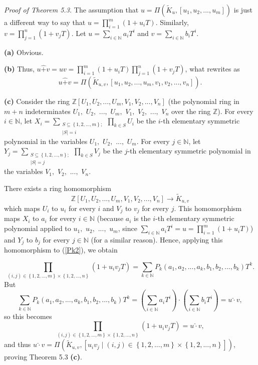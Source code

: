 \documentclass[12pt,final,notitlepage,onecolumn,german]{article}%
\begin{document}
\textit{Proof of Theorem 5.3.} The assumption that $u=\Pi\left(  \widetilde
{K}_{u},\left[  u_{1},u_{2},...,u_{m}\right]  \right)  $ is just a different
way to say that $u=\prod\limits_{i=1}^{m}\left(  1+u_{i}T\right)  $.
Similarly, $v=\prod\limits_{j=1}^{n}\left(  1+v_{j}T\right)  $. Let
$u=\sum\limits_{i\in\mathbb{N}}a_{i}T^{i}$ and $v=\sum\limits_{i\in\mathbb{N}%
}b_{i}T^{i}$.

\textbf{(a)} Obvious.

\textbf{(b)} Thus, $u\widehat{+}v=uv=\prod\limits_{i=1}^{m}\left(
1+u_{i}T\right)  \prod\limits_{j=1}^{n}\left(  1+v_{j}T\right)  $, what
rewrites as%
\[
u\widehat{+}v=\Pi\left(  \widetilde{K}_{u,v},\left[  u_{1},u_{2}%
,...,u_{m},v_{1},v_{2},...,v_{n}\right]  \right)  .
\]


\textbf{(c)} Consider the ring $\mathbb{Z}\left[  U_{1},U_{2},...,U_{m}%
,V_{1},V_{2},...,V_{n}\right]  $ (the polynomial ring in $m+n$ indeterminates
$U_{1},$ $U_{2},$ $...,$ $U_{m},$ $V_{1},$ $V_{2},$ $...,$ $V_{n}$ over the
ring $\mathbb{Z}$). For every $i\in\mathbb{N}$, let $X_{i}=\sum
\limits_{\substack{S\subseteq\left\{  1,2,...,m\right\}  ;\\\left\vert
S\right\vert =i}}\prod\limits_{k\in S}U_{i}$ be the $i$-th elementary
symmetric polynomial in the variables $U_{1},$ $U_{2},$ $...,$ $U_{m}$. For
every $j\in\mathbb{N}$, let $Y_{j}=\sum\limits_{\substack{S\subseteq\left\{
1,2,...,n\right\}  ;\\\left\vert S\right\vert =j}}\prod\limits_{k\in S}V_{j}$
be the $j$-th elementary symmetric polynomial in the variables $V_{1},$
$V_{2},$ $...,$ $V_{n}$.

There exists a ring homomorphism%
\[
\mathbb{Z}\left[  U_{1},U_{2},...,U_{m},V_{1},V_{2},...,V_{n}\right]
\rightarrow\widetilde{K}_{u,v}%
\]
which maps $U_{i}$ to $u_{i}$ for every $i$ and $V_{j}$ to $v_{j}$ for every
$j$. This homomorphism maps $X_{i}$ to $a_{i}$ for every $i\in\mathbb{N}$
(because $a_{i}$ is the $i$-th elementary symmetric polynomial applied to
$u_{1},$ $u_{2},$ $...,$ $u_{m}$, since $\sum\limits_{i\in\mathbb{N}}%
a_{i}T^{i}=u=\prod\limits_{i=1}^{m}\left(  1+u_{i}T\right)  $) and $Y_{j}$ to
$b_{j}$ for every $j\in\mathbb{N}$ (for a similar reason). Hence, applying
this homomorphism to (\ref{Pk2}), we obtain%

\[
\prod_{\left(  i,j\right)  \in\left\{  1,2,...,m\right\}  \times\left\{
1,2,...,n\right\}  }\left(  1+u_{i}v_{j}T\right)  =\sum_{k\in\mathbb{N}}%
P_{k}\left(  a_{1},a_{2},...,a_{k},b_{1},b_{2},...,b_{k}\right)  T^{k}.
\]
But%
\[
\sum_{k\in\mathbb{N}}P_{k}\left(  a_{1},a_{2},...,a_{k},b_{1},b_{2}%
,...,b_{k}\right)  T^{k}=\left(  \sum_{i\in\mathbb{N}}a_{i}T^{i}\right)
\widehat{\cdot}\left(  \sum_{i\in\mathbb{N}}b_{i}T^{i}\right)  =u\widehat
{\cdot}v,
\]
so this becomes%
\[
\prod_{\left(  i,j\right)  \in\left\{  1,2,...,m\right\}  \times\left\{
1,2,...,n\right\}  }\left(  1+u_{i}v_{j}T\right)  =u\widehat{\cdot}v,
\]
and thus $u\widehat{\cdot}v=\Pi\left(  \widetilde{K}_{u,v},\left[  u_{i}%
v_{j}\mid\left(  i,j\right)  \in\left\{  1,2,...,m\right\}  \times\left\{
1,2,...,n\right\}  \right]  \right)  $, proving Theorem 5.3 \textbf{(c)}.
\end{document}
